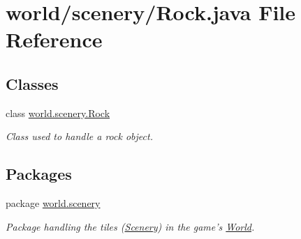 \hypertarget{a00068}{\section{world/scenery/\-Rock.java File Reference}
\label{a00068}
}
\subsection*{Classes}
\begin{DoxyCompactItemize}
\item 
class \hyperlink{a00022}{world.\-scenery.\-Rock}
\begin{DoxyCompactList}\small\item\em Class used to handle a rock object. \end{DoxyCompactList}\end{DoxyCompactItemize}
\subsection*{Packages}
\begin{DoxyCompactItemize}
\item 
package \hyperlink{a00091}{world.\-scenery}
\begin{DoxyCompactList}\small\item\em Package handling the tiles (\hyperlink{a00024}{Scenery}) in the game's \hyperlink{a00039}{World}. \end{DoxyCompactList}\end{DoxyCompactItemize}

